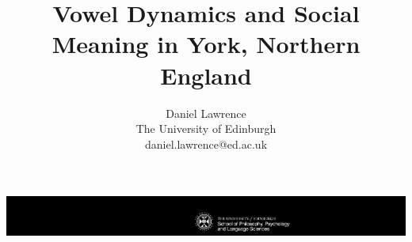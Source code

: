 \documentclass[a0,portrait]{a0poster}
\title{\Huge{Vowel Dynamics and Social Meaning in York, Northern England}}
\author{Daniel Lawrence\\The University of Edinburgh\\\hspace{0.5cm}daniel.lawrence@ed.ac.uk}
\begin{document}
\hspace{-6cm}								%
\vspace{-2cm}
\includegraphics{Black_Landscape_portrait.pdf}

\begin{minipage}{1191mm}					%
\vspace{-18cm}
\maketitle
\end{minipage}
\vspace{.5cm}
\end{document}
